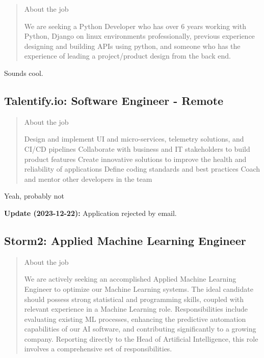 \documentclass[
	letterpaper, %
	12pt, %
]{CSSullivanBusinessReport}
\begin{document}
\begin{quote}
	About the job
	
	We are seeking a Python Developer who has over 6 years working with Python, Django on linux environments professionally, previous experience designing and building APIs using python, and someone who has the experience of leading a project/product design from the back end.

\end{quote}

Sounds cool.


\subsection[Talentify.io]{Talentify.io: Software Engineer - Remote}

\begin{quote}
	About the job
	
	Design and implement UI and micro-services, telemetry solutions, and CI/CD pipelines
	Collaborate with business and IT stakeholders to build product features
	Create innovative solutions to improve the health and reliability of applications
	Define coding standards and best practices
	Coach and mentor other developers in the team

\end{quote}

Yeah, probably not

\textbf{Update (2023-12-22):} Application rejected by email.


\subsection[Storm2]{Storm2: Applied Machine Learning Engineer}

\begin{quote}
	About the job
	
	We are actively seeking an accomplished Applied Machine Learning Engineer to optimize our Machine Learning systems. The ideal candidate should possess strong statistical and programming skills, coupled with relevant experience in a Machine Learning role. Responsibilities include evaluating existing ML processes, enhancing the predictive automation capabilities of our AI software, and contributing significantly to a growing company. Reporting directly to the Head of Artificial Intelligence, this role involves a comprehensive set of responsibilities.

\end{quote}
\end{document}
